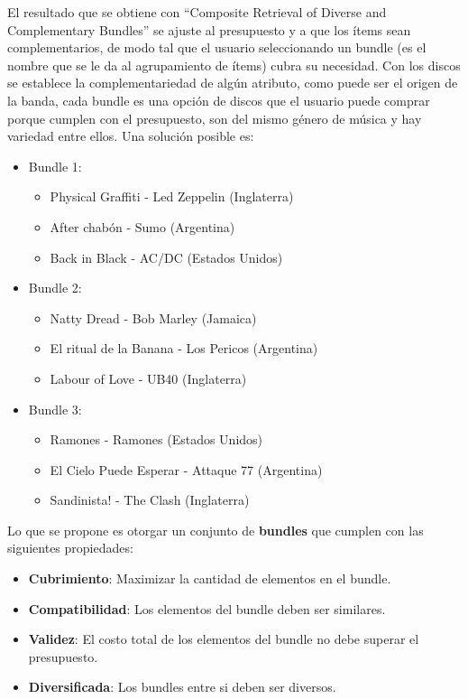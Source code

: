 El resultado que se obtiene con ``Composite Retrieval of Diverse and Complementary Bundles'' se ajuste al presupuesto y a que los ítems sean complementarios, de modo tal que el usuario seleccionando un bundle (es el nombre que se le da al agrupamiento de ítems) cubra su necesidad. Con los discos se establece la complementariedad de algún atributo, como puede ser el origen de la banda, cada bundle es una opción de discos que el usuario puede comprar porque cumplen con el presupuesto, son del mismo género de música y hay variedad entre ellos. Una solución posible es:
\begin{itemize}
  \item Bundle 1:
  \begin{itemize}
    \item Physical Graffiti - Led Zeppelin (Inglaterra)
    \item After chabón - Sumo (Argentina)
    \item Back in Black - AC/DC (Estados Unidos)
  \end{itemize}
  \item Bundle 2:
  \begin{itemize}
    \item Natty Dread - Bob Marley (Jamaica)
    \item El ritual de la Banana - Los Pericos (Argentina)
    \item Labour of Love - UB40 (Inglaterra)
  \end{itemize}
	  \item Bundle 3:
  \begin{itemize}
    \item Ramones - Ramones (Estados Unidos)
    \item El Cielo Puede Esperar - Attaque 77 (Argentina)
    \item Sandinista! - The Clash (Inglaterra)
  \end{itemize}
\end{itemize}

Lo que se propone es otorgar un conjunto de \textbf{bundles} que cumplen con las siguientes propiedades:
\begin{itemize}
  \item \textbf{Cubrimiento}: Maximizar la cantidad de elementos en el bundle.
  \item \textbf{Compatibilidad}: Los elementos del bundle deben ser similares.
  \item \textbf{Validez}: El costo total de los elementos del bundle no debe superar el presupuesto.
  \item \textbf{Diversificada}: Los bundles entre si deben ser diversos.
\end{itemize}

